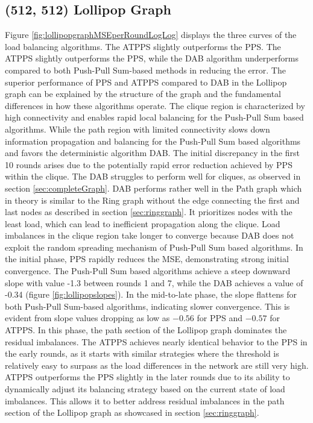 \subsection{(512, 512) Lollipop Graph}
Figure \ref{fig:lollipopgraphMSEperRoundLogLog} displays the three curves of the load balancing algorithms. The ATPPS slightly outperforms the PPS. The ATPPS slightly outperforms the PPS, while the DAB algorithm underperforms compared to both Push-Pull Sum-based methods in reducing the error. The superior performance of PPS and ATPPS compared to DAB in the Lollipop graph can be explained by the structure of the graph and the fundamental differences in how these algorithms operate. The clique region is characterized by high connectivity and enables rapid local balancing for the Push-Pull Sum based algorithms. While the path region with limited connectivity slows down information propagation and balancing for the Push-Pull Sum based algorithms and favors the deterministic algorithm DAB. The initial discrepancy in the first 10 rounds arises due to the potentially rapid error reduction achieved by PPS within the clique. The DAB struggles to perform well for cliques, as observed in section \ref{sec:completeGraph}. DAB performs rather well in the Path graph which in theory is similar to the Ring graph without the edge connecting the first and last nodes as described in section \ref{sec:ringgraph}. It prioritizes nodes with the least load, which can lead to inefficient propagation along the clique. Load imbalances in the clique region take longer to converge because DAB does not exploit the random spreading mechanism of Push-Pull Sum based algorithms. In the initial phase, PPS rapidly reduces the MSE, demonstrating strong initial convergence. The Push-Pull Sum based algorithms achieve a steep downward slope with value -1.3 between rounds 1 and 7, while the DAB achieves a value of -0.34 (figure \ref{fig:lollipopslopes}). In the mid-to-late phase, the slope flattens for both Push-Pull Sum-based algorithms, indicating slower convergence. This is evident from slope values dropping as low as $-0.56$ for PPS and $-0.57$ for ATPPS. In this phase, the path section of the Lollipop graph dominates the residual imbalances. The ATPPS achieves nearly identical behavior to the PPS in the early rounds, as it starts with similar strategies where the threshold is relatively easy to surpass as the load differences in the network are still very high. ATPPS outperforms the PPS slightly in the later rounds due to its ability to dynamically adjust its balancing strategy based on the current state of load imbalances. This allows it to better address residual imbalances in the path section of the Lollipop graph as showcased in section \ref{sec:ringgraph}.

